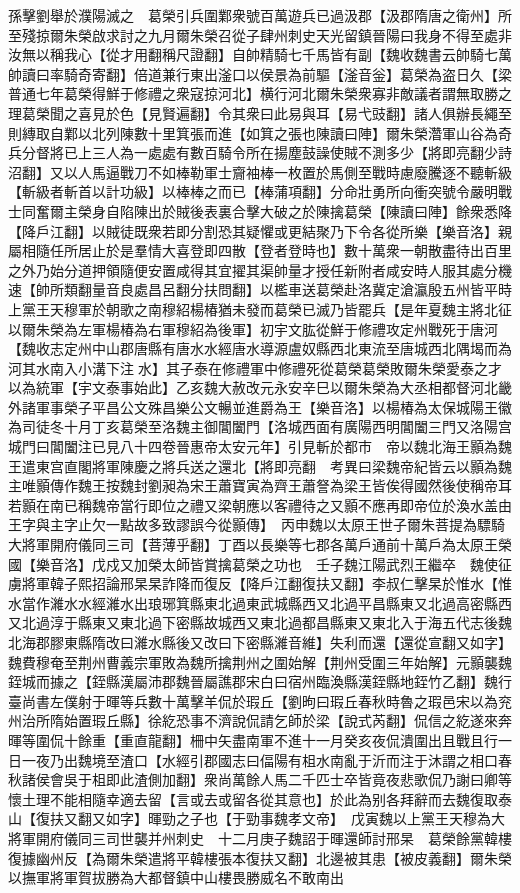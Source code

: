 孫擊劉舉於濮陽滅之　葛榮引兵圍鄴衆號百萬遊兵已過汲郡【汲郡隋唐之衛州】所至殘掠爾朱榮啟求討之九月爾朱榮召從子肆州刺史天光留鎮晉陽曰我身不得至處非汝無以稱我心【從才用翻稱尺證翻】自帥精騎七千馬皆有副【魏收魏書云帥騎七萬帥讀曰率騎奇寄翻】倍道兼行東出滏口以侯景為前驅【滏音釡】葛榮為盗日久【梁普通七年葛榮得鮮于修禮之衆寇掠河北】横行河北爾朱榮衆寡非敵議者謂無取勝之理葛榮聞之喜見於色【見賢遍翻】令其衆曰此易與耳【易弋豉翻】諸人俱辦長繩至則縳取自鄴以北列陳數十里箕張而進【如箕之張也陳讀曰陣】爾朱榮濳軍山谷為奇兵分督將已上三人為一處處有數百騎令所在揚塵鼓譟使賊不測多少【將即亮翻少詩沼翻】又以人馬逼戰刀不如棒勒軍士齎袖棒一枚置於馬側至戰時慮廢騰逐不聽斬級【斬級者斬首以計功級】以棒棒之而已【棒蒲項翻】分命壯勇所向衝突號令嚴明戰士同奮爾主榮身自陷陳出於賊後表裏合擊大破之於陳擒葛榮【陳讀曰陣】餘衆悉降【降戶江翻】以賊徒既衆若即分割恐其疑懼或更結聚乃下令各從所樂【樂音洛】親屬相隨任所居止於是羣情大喜登即四散【登者登時也】數十萬衆一朝散盡待出百里之外乃始分道押領隨便安置咸得其宜擢其渠帥量才授任新附者咸安時人服其處分機速【帥所類翻量音良處昌呂翻分扶問翻】以檻車送葛榮赴洛冀定滄瀛殷五州皆平時上黨王天穆軍於朝歌之南穆紹楊椿猶未發而葛榮已滅乃皆罷兵【是年夏魏主將北征以爾朱榮為左軍楊椿為右軍穆紹為後軍】初宇文肱從鮮于修禮攻定州戰死于唐河【魏收志定州中山郡唐縣有唐水水經唐水導源盧奴縣西北東流至唐城西北隅堨而為河其水南入小溝下注水】其子泰在修禮軍中修禮死從葛榮葛榮敗爾朱榮愛泰之才以為統軍【宇文泰事始此】乙亥魏大赦改元永安辛巳以爾朱榮為大丞相都督河北畿外諸軍事榮子平昌公文殊昌樂公文暢並進爵為王【樂音洛】以楊椿為太保城陽王徽為司徒冬十月丁亥葛榮至洛魏主御閶闔門【洛城西面有廣陽西明閶闔三門又洛陽宫城門曰閶闔注已見八十四卷晉惠帝太安元年】引見斬於都市　帝以魏北海王顥為魏王遣東宫直閣將軍陳慶之將兵送之還北【將即亮翻　考異曰梁魏帝紀皆云以顥為魏主唯顥傳作魏王按魏封劉昶為宋王蕭寶寅為齊王蕭詧為梁王皆俟得國然後使稱帝耳若顥在南已稱魏帝當行即位之禮又梁朝應以客禮待之又顥不應再即帝位於渙水盖由王字與主字止欠一點故多致謬誤今從顥傳】　丙申魏以太原王世子爾朱菩提為驃騎大將軍開府儀同三司【菩薄乎翻】丁酉以長樂等七郡各萬戶通前十萬戶為太原王榮國【樂音洛】戊戍又加榮太師皆賞擒葛榮之功也　壬子魏江陽武烈王繼卒　魏使征虜將軍韓子熙招論邢杲杲詐降而復反【降戶江翻復扶又翻】李叔仁擊杲於惟水【惟水當作濰水水經濰水出琅琊箕縣東北過東武城縣西又北過平昌縣東又北過高密縣西又北過淳于縣東又東北過下密縣故城西又東北過都昌縣東又東北入于海五代志後魏北海郡膠東縣隋改曰濰水縣後又改曰下密縣濰音維】失利而還【還從宣翻又如字】　魏費穆奄至荆州曹義宗軍敗為魏所擒荆州之圍始解【荆州受圍三年始解】元顥襲魏銍城而據之【銍縣漢屬沛郡魏晉屬譙郡宋白曰宿州臨渙縣漢銍縣地銍竹乙翻】魏行臺尚書左僕射于暉等兵數十萬擊羊侃於瑕丘【劉昫曰瑕丘春秋時魯之瑕邑宋以為兖州治所隋始置瑕丘縣】徐紇恐事不濟說侃請乞師於梁【說式芮翻】侃信之紇遂來奔暉等圍侃十餘重【重直龍翻】柵中矢盡南軍不進十一月癸亥夜侃潰圍出且戰且行一日一夜乃出魏境至渣口【水經引郡國志曰偪陽有柤水南亂于沂而注于沐謂之相口春秋諸侯會吳于柤即此渣側加翻】衆尚萬餘人馬二千匹士卒皆竟夜悲歌侃乃謝曰卿等懷土理不能相隨幸適去留【言或去或留各從其意也】於此為别各拜辭而去魏復取泰山【復扶又翻又如字】暉勁之子也【于勁事魏孝文帝】　戊寅魏以上黨王天穆為大將軍開府儀同三司世襲并州刺史　十二月庚子魏詔于暉還師討邢杲　葛榮餘黨韓樓復據幽州反【為爾朱榮遣將平韓樓張本復扶又翻】北邊被其患【被皮義翻】爾朱榮以撫軍將軍賀拔勝為大都督鎮中山樓畏勝威名不敢南出

